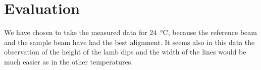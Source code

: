 
\chapter{Evaluation}
\label{chap:eval}
We have chosen to take the measured data for \SI{24}{\celsius}, because the reference beam and the sample beam have had the best alignment. It seems also in this data the observation of the height of the lamb dips and the width of the lines would be much easier as in the other temperatures.









